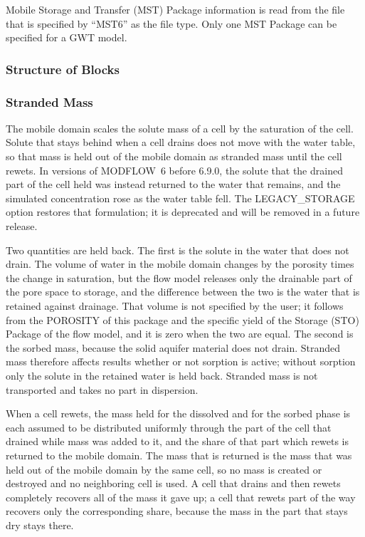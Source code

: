 Mobile Storage and Transfer (MST) Package information is read from the file that is specified by ``MST6'' as the file type.  Only one MST Package can be specified for a GWT model. 

\vspace{5mm}
\subsubsection{Structure of Blocks}



\vspace{5mm}
\subsubsection{Stranded Mass}
The mobile domain scales the solute mass of a cell by the saturation of the cell.  Solute that stays behind when a cell drains does not move with the water table, so that mass is held out of the mobile domain as stranded mass until the cell rewets.  In versions of MODFLOW~6 before 6.9.0, the solute that the drained part of the cell held was instead returned to the water that remains, and the simulated concentration rose as the water table fell.  The LEGACY\_STORAGE option restores that formulation; it is deprecated and will be removed in a future release.

Two quantities are held back.  The first is the solute in the water that does not drain.  The volume of water in the mobile domain changes by the porosity times the change in saturation, but the flow model releases only the drainable part of the pore space to storage, and the difference between the two is the water that is retained against drainage.  That volume is not specified by the user; it follows from the POROSITY of this package and the specific yield of the Storage (STO) Package of the flow model, and it is zero when the two are equal.  The second is the sorbed mass, because the solid aquifer material does not drain.  Stranded mass therefore affects results whether or not sorption is active; without sorption only the solute in the retained water is held back.  Stranded mass is not transported and takes no part in dispersion.

When a cell rewets, the mass held for the dissolved and for the sorbed phase is each assumed to be distributed uniformly through the part of the cell that drained while mass was added to it, and the share of that part which rewets is returned to the mobile domain.  The mass that is returned is the mass that was held out of the mobile domain by the same cell, so no mass is created or destroyed and no neighboring cell is used.  A cell that drains and then rewets completely recovers all of the mass it gave up; a cell that rewets part of the way recovers only the corresponding share, because the mass in the part that stays dry stays there.

